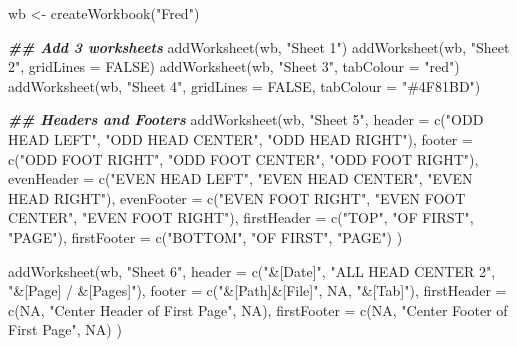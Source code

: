 \documentclass[
]{book}
\newenvironment{Shaded}{\begin{snugshade}}{\end{snugshade}}
\newcommand{\AttributeTok}[1]{\textcolor[rgb]{0.77,0.63,0.00}{#1}}
\newcommand{\ConstantTok}[1]{\textcolor[rgb]{0.00,0.00,0.00}{#1}}
\newcommand{\DocumentationTok}[1]{\textcolor[rgb]{0.56,0.35,0.01}{\textbf{\textit{#1}}}}
\newcommand{\FunctionTok}[1]{\textcolor[rgb]{0.00,0.00,0.00}{#1}}
\newcommand{\NormalTok}[1]{#1}
\newcommand{\OtherTok}[1]{\textcolor[rgb]{0.56,0.35,0.01}{#1}}
\newcommand{\StringTok}[1]{\textcolor[rgb]{0.31,0.60,0.02}{#1}}
\begin{document}
\begin{Shaded}
\begin{Highlighting}[]
\NormalTok{wb }\OtherTok{\textless{}{-}} \FunctionTok{createWorkbook}\NormalTok{(}\StringTok{"Fred"}\NormalTok{)}

\DocumentationTok{\#\# Add 3 worksheets}
\FunctionTok{addWorksheet}\NormalTok{(wb, }\StringTok{"Sheet 1"}\NormalTok{)}
\FunctionTok{addWorksheet}\NormalTok{(wb, }\StringTok{"Sheet 2"}\NormalTok{, }\AttributeTok{gridLines =} \ConstantTok{FALSE}\NormalTok{)}
\FunctionTok{addWorksheet}\NormalTok{(wb, }\StringTok{"Sheet 3"}\NormalTok{, }\AttributeTok{tabColour =} \StringTok{"red"}\NormalTok{)}
\FunctionTok{addWorksheet}\NormalTok{(wb, }\StringTok{"Sheet 4"}\NormalTok{, }\AttributeTok{gridLines =} \ConstantTok{FALSE}\NormalTok{, }\AttributeTok{tabColour =} \StringTok{"\#4F81BD"}\NormalTok{)}

\DocumentationTok{\#\# Headers and Footers}
\FunctionTok{addWorksheet}\NormalTok{(wb, }\StringTok{"Sheet 5"}\NormalTok{,}
  \AttributeTok{header =} \FunctionTok{c}\NormalTok{(}\StringTok{"ODD HEAD LEFT"}\NormalTok{, }\StringTok{"ODD HEAD CENTER"}\NormalTok{, }\StringTok{"ODD HEAD RIGHT"}\NormalTok{),}
  \AttributeTok{footer =} \FunctionTok{c}\NormalTok{(}\StringTok{"ODD FOOT RIGHT"}\NormalTok{, }\StringTok{"ODD FOOT CENTER"}\NormalTok{, }\StringTok{"ODD FOOT RIGHT"}\NormalTok{),}
  \AttributeTok{evenHeader =} \FunctionTok{c}\NormalTok{(}\StringTok{"EVEN HEAD LEFT"}\NormalTok{, }\StringTok{"EVEN HEAD CENTER"}\NormalTok{, }\StringTok{"EVEN HEAD RIGHT"}\NormalTok{),}
  \AttributeTok{evenFooter =} \FunctionTok{c}\NormalTok{(}\StringTok{"EVEN FOOT RIGHT"}\NormalTok{, }\StringTok{"EVEN FOOT CENTER"}\NormalTok{, }\StringTok{"EVEN FOOT RIGHT"}\NormalTok{),}
  \AttributeTok{firstHeader =} \FunctionTok{c}\NormalTok{(}\StringTok{"TOP"}\NormalTok{, }\StringTok{"OF FIRST"}\NormalTok{, }\StringTok{"PAGE"}\NormalTok{),}
  \AttributeTok{firstFooter =} \FunctionTok{c}\NormalTok{(}\StringTok{"BOTTOM"}\NormalTok{, }\StringTok{"OF FIRST"}\NormalTok{, }\StringTok{"PAGE"}\NormalTok{)}
\NormalTok{)}

\FunctionTok{addWorksheet}\NormalTok{(wb, }\StringTok{"Sheet 6"}\NormalTok{,}
  \AttributeTok{header =} \FunctionTok{c}\NormalTok{(}\StringTok{"\&[Date]"}\NormalTok{, }\StringTok{"ALL HEAD CENTER 2"}\NormalTok{, }\StringTok{"\&[Page] / \&[Pages]"}\NormalTok{),}
  \AttributeTok{footer =} \FunctionTok{c}\NormalTok{(}\StringTok{"\&[Path]\&[File]"}\NormalTok{, }\ConstantTok{NA}\NormalTok{, }\StringTok{"\&[Tab]"}\NormalTok{),}
  \AttributeTok{firstHeader =} \FunctionTok{c}\NormalTok{(}\ConstantTok{NA}\NormalTok{, }\StringTok{"Center Header of First Page"}\NormalTok{, }\ConstantTok{NA}\NormalTok{),}
  \AttributeTok{firstFooter =} \FunctionTok{c}\NormalTok{(}\ConstantTok{NA}\NormalTok{, }\StringTok{"Center Footer of First Page"}\NormalTok{, }\ConstantTok{NA}\NormalTok{)}
\NormalTok{)}


\end{Highlighting}
\end{Shaded}
\end{document}
